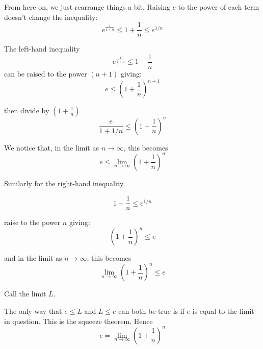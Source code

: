 \documentclass[11pt, oneside]{article}
\begin{document}
From here on, we just rearrange things a bit.  Raising $e$ to the power of each term doesn't change the inequality:
\[ e^{\frac{1}{1 + n}} \le 1 + \frac{1}{n} \le e^{1/n}\]

The left-hand inequality
\[ e^{\frac{1}{1 + n}} \le 1 + \frac{1}{n} \]
can be raised to the power $(n+1)$ giving:
\[ e \le (1 + \frac{1}{n})^{n + 1} \]

then divide by $ (1 + \frac{1}{n})$
\[ \frac{e}{1 + 1/n} \le (1 + \frac{1}{n})^{n} \]

We notice that, in the limit as $n \rightarrow \infty$, this becomes 
\[ e \le  \lim_{n \rightarrow \infty} (1 + \frac{1}{n})^n \]

Similarly for the right-hand inequality, 

\[ 1 + \frac{1}{n} \le e^{1/n}\]

raise to the power $n$ giving:
\[ (1 + \frac{1}{n})^{n} \le e \]

and in the limit as $n \rightarrow \infty$, this becomes
\[ \lim_{n \rightarrow \infty} (1 + \frac{1}{n})^{n} \le e \]

Call the limit $L$.

The only way that $e \le L$ and $L \le e$ can both be true is if $e$ is equal to the limit in question.  This is the squeeze theorem.  Hence
\[ e = \lim_{n \rightarrow \infty} (1 + \frac{1}{n})^n \]
\end{document}
